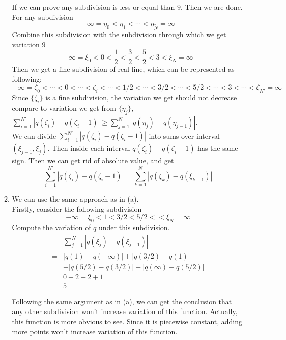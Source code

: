 \documentclass[11pt]{article}
\begin{document}
\begin{enumerate}
\begin{enumerate}
					If we can prove any subdivision is less or equal than $9$. Then we are done.\\
					
					For any subdivision 
					\[
					-\infty=\eta_0 < \eta_1<\cdots<\eta_{\tilde{N}}=\infty
					\]
					Combine this subdivision with the subdivision through which we get variation $9$	
					\[
					-\infty=\xi_0<0<\frac{1}{2}<\frac{3}{2}<\frac{5}{2}<3<\xi_N=\infty
					\]	
					Then we get a fine subdivision of real line, which can be represented as following:
					\[
					-\infty=\zeta_0<\cdots<0<\cdots<\zeta_i<\cdots<1/2<\cdots<3/2<\cdots<5/2<\cdots<3<\cdots<\zeta_{N'}=\infty
					\]	
					Since $\{\zeta_i\}$ is a fine subdivision, the variation we get should not decrease compare to variation we get from $\{\eta_j\}$, $\sum_{i=1}^{N'}|q(\zeta_i)-q(\zeta_i-1)|\geq \sum_{j=1}^{\tilde{N}}|q(\eta_j)-q(\eta_{j-1})|$.\\
						
					We can divide $\sum_{i=1}^{N'}|q(\zeta_i)-q(\zeta_i-1)|$ into sums over interval $(\xi_{j-1},\xi_{j})$. Then inside each interval $q(\zeta_i)-q(\zeta_i-1)$	 has the same sign. Then we can get rid of absolute value, and get
					\[
					\sum_{i=1}^{N'}|q(\zeta_i)-q(\zeta_i-1)| 
					= \sum_{k=1}^N|q(\xi_k)-q(\xi_{k-1})|
					\]
					
				\item
					We can use the same approach as in (a).\\
					
					Firstly, consider the following subdivision 
					\[
					-\infty =\xi_0<1<3/2<5/2<<\xi_N=\infty
					\]	
					Compute the variation of $q$ under this subdivision.
					\begin{align*}
					&\sum_{j=1}^{N}|q(\xi_j)-q(\xi_{j-1})|\\
					=&|q(1)-q(-\infty)|+|q(3/2)-q(1)|\\
					&+|q(5/2)-q(3/2)|+|q(\infty)-q(5/2)|\\
					=&0+2+2+1\\
					=&5
					\end{align*}
					
					Following the same argument as in (a), we can get the conclusion that any other subdivision won't increase variation of this function. Actually, this function is more obvious to see. Since it is piecewise constant, adding more points won't increase variation of this function.
			
			\end{enumerate}            


\end{enumerate}
\end{document}
